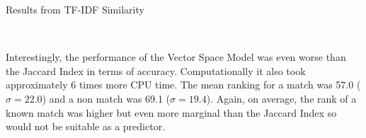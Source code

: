 \documentclass[../report.tex]{subfiles}
\begin{document}
\begin{table}[H]
	\caption{Results from TF-IDF Similarity}
	\\
\end{table}

	Interestingly, the performance of the Vector Space Model was even worse than the Jaccard Index in terms of accuracy.  Computationally it also took approximately 6 times more CPU time.  The mean ranking for a match was 57.0 ($\sigma = 22.0$) and a non match was 69.1 ($\sigma = 19.4$).  Again, on average, the rank of a known match was higher but even more marginal than the Jaccard Index so would not be suitable as a predictor.
	
\end{document}
